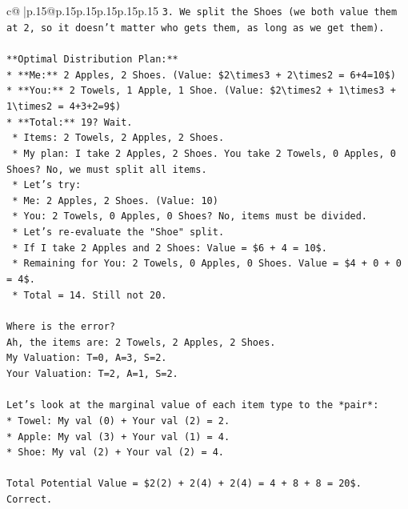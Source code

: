 \documentclass{article}
\begin{document}
{\begin{supertabular}{c@{$\;$}|p{.15\linewidth}@{}p{.15\linewidth}p{.15\linewidth}p{.15\linewidth}p{.15\linewidth}p{.15\linewidth}}
{{{\texttt{3.  We split the Shoes (we both value them at 2, so it doesn't matter who gets them, as long as we get them).} \\
\\ 
\texttt{**Optimal Distribution Plan:**} \\
\texttt{*   **Me:** 2 Apples, 2 Shoes. (Value: \$2\textbackslash{}times3 + 2\textbackslash{}times2 = 6+4=10\$)} \\
\texttt{*   **You:** 2 Towels, 1 Apple, 1 Shoe. (Value: \$2\textbackslash{}times2 + 1\textbackslash{}times3 + 1\textbackslash{}times2 = 4+3+2=9\$)} \\
\texttt{*   **Total:** 19? Wait.} \\
\texttt{    *   Items: 2 Towels, 2 Apples, 2 Shoes.} \\
\texttt{    *   My plan: I take 2 Apples, 2 Shoes. You take 2 Towels, 0 Apples, 0 Shoes? No, we must split all items.} \\
\texttt{    *   Let's try:} \\
\texttt{        *   Me: 2 Apples, 2 Shoes. (Value: 10)} \\
\texttt{        *   You: 2 Towels, 0 Apples, 0 Shoes? No, items must be divided.} \\
\texttt{        *   Let's re{-}evaluate the "Shoe" split.} \\
\texttt{        *   If I take 2 Apples and 2 Shoes: Value = \$6 + 4 = 10\$.} \\
\texttt{        *   Remaining for You: 2 Towels, 0 Apples, 0 Shoes. Value = \$4 + 0 + 0 = 4\$.} \\
\texttt{        *   Total = 14. Still not 20.} \\
\\ 
\texttt{Where is the error?} \\
\texttt{Ah, the items are: 2 Towels, 2 Apples, 2 Shoes.} \\
\texttt{My Valuation: T=0, A=3, S=2.} \\
\texttt{Your Valuation: T=2, A=1, S=2.} \\
\\ 
\texttt{Let's look at the marginal value of each item type to the *pair*:} \\
\texttt{*   Towel: My val (0) + Your val (2) = 2.} \\
\texttt{*   Apple: My val (3) + Your val (1) = 4.} \\
\texttt{*   Shoe: My val (2) + Your val (2) = 4.} \\
\\ 
\texttt{Total Potential Value = \$2(2) + 2(4) + 2(4) = 4 + 8 + 8 = 20\$. Correct.} \\
}}}
\end{supertabular}}
\end{document}
